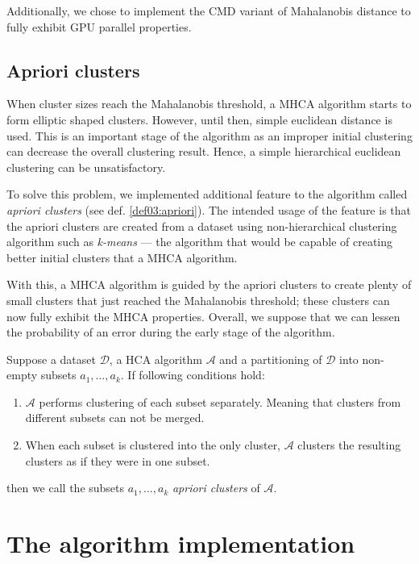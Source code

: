 Additionally, we chose to implement the CMD variant of Mahalanobis distance to fully exhibit GPU parallel properties.

\subsection{Apriori clusters}

When cluster sizes reach the Mahalanobis threshold, a MHCA algorithm starts to form elliptic shaped clusters. However, until then, simple euclidean distance is used. This is an important stage of the algorithm as an improper initial clustering can decrease the overall clustering result. Hence, a simple hierarchical euclidean clustering can be unsatisfactory.

To solve this problem, we implemented additional feature to the algorithm called \emph{apriori clusters} (see def. \ref{def03:apriori}). The intended usage of the feature is that the apriori clusters are created from a dataset using non-hierarchical clustering algorithm such as \emph{k-means} --- the algorithm that would be capable of creating better initial clusters that a MHCA algorithm. 

With this, a MHCA algorithm is guided by the apriori clusters to create plenty of small clusters that just reached the Mahalanobis threshold; these clusters can now fully exhibit the MHCA properties. Overall, we suppose that we can lessen the probability of an error during the early stage of the algorithm.

\begin{defn}
	Suppose a dataset $\mathcal{D}$, a HCA algorithm $\mathcal{A}$ and a partitioning of  $\mathcal{D}$ into non-empty subsets $a_1,\dots,a_k$. If following conditions hold:
	\begin{enumerate}
		\item $\mathcal{A}$ performs clustering of each subset separately. Meaning that clusters from different subsets can not be merged.
		\item When each subset is clustered into the only cluster, $\mathcal{A}$ clusters the resulting clusters as if they were in one subset.
	\end{enumerate}
	then we call the subsets $a_1,\dots,a_k$ \emph{apriori clusters} of $\mathcal{A}$.
	\label{def03:apriori}
\end{defn}

\section{The algorithm implementation}

